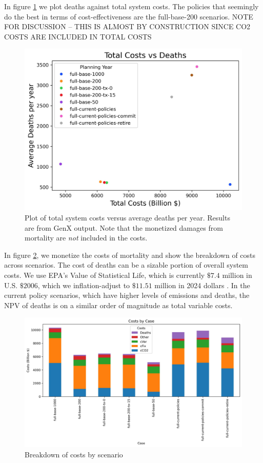 \documentclass[a4paper]{article}
\theoremstyle{definition}
\theoremstyle{plain}
\begin{document}
In figure \ref{DeathsCosts} we plot deaths against total system costs.  The policies that seemingly do the best in terms of cost-effectiveness are the full-base-200 scenarios.  NOTE FOR DISCUSSION -- THIS IS ALMOST BY CONSTRUCTION SINCE CO2 COSTS ARE INCLUDED IN TOTAL COSTS
\begin{figure}
    \centering
    \includegraphics[width=0.8\linewidth]{Figures/Output/Deaths_vs_Costs_GenX.png}
    \caption{Plot of total system costs versus average deaths per year.  Results are from GenX output.  Note that the monetized damages from mortality are \textit{not} included in the costs.}
    \label{DeathsCosts}
\end{figure}

In figure \ref{CostsBarchart}, we monetize the costs of mortality and show the breakdown of costs across scenarios.  The cost of deaths can be a sizable portion of overall system costs.  We use EPA's Value of Statistical Life, which is currently $\$7.4$ million in U.S. $\$ 2006$, which we inflation-adjust to $\$11.51$ million in 2024 dollars \citep{U.S.EnvironmentalProtectionAgencyMortalityEPA}.  In the current policy scenarios, which have higher levels of emissions and deaths, the NPV of deaths is on a similar order of magnitude as total variable costs.

\begin{figure}
    \centering
    \includegraphics[width=0.8\linewidth]{Figures/Output/Costs_Barchart_GenX.png}
    \caption{Breakdown of costs by scenario}
    \label{CostsBarchart}
\end{figure}
\end{document}
